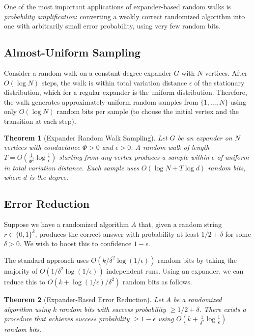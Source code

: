 \documentclass[twoside,12pt]{book}
\theoremstyle{plain}
\newtheorem{theorem}{Theorem}[chapter]
\theoremstyle{definition}
\theoremstyle{remark}
\begin{document}
One of the most important applications of expander-based random walks is
\emph{probability amplification}: converting a weakly correct randomized
algorithm into one with arbitrarily small error probability, using very
few random bits.

\subsection{Almost-Uniform Sampling}

Consider a random walk on a constant-degree expander $G$ with $N$ vertices.
After $O(\log N)$ steps, the walk is within total variation distance
$\epsilon$ of the stationary distribution, which for a regular expander
is the uniform distribution. Therefore, the walk generates
approximately uniform random samples from $\{1, \ldots, N\}$ using only
$O(\log N)$ random bits per sample (to choose the initial vertex and the
transition at each step).

\begin{theorem}[Expander Random Walk Sampling]\label{thm:exp-sampling}
Let $G$ be an expander on $N$ vertices with conductance $\Phi > 0$ and
$\epsilon > 0$. A random walk of length $T = O(\frac{1}{\Phi^2} \log
\frac{1}{\epsilon})$ starting from any vertex produces a sample within
$\epsilon$ of uniform in total variation distance. Each sample uses
$O(\log N + T \log d)$ random bits, where $d$ is the degree.
\end{theorem}

\subsection{Error Reduction}

Suppose we have a randomized algorithm $A$ that, given a random string
$r \in \{0,1\}^k$, produces the correct answer with probability at least
$1/2 + \delta$ for some $\delta > 0$. We wish to boost this to
confidence $1 - \epsilon$.

The standard approach uses $O(k/\delta^2 \log(1/\epsilon))$ random bits
by taking the majority of $O(1/\delta^2 \log(1/\epsilon))$ independent
runs. Using an expander, we can reduce this to $O(k + \log(1/\epsilon) /
\delta^2)$ random bits as follows.

\begin{theorem}[Expander-Based Error Reduction]\label{thm:error-reduction}
Let $A$ be a randomized algorithm using $k$ random bits with success
probability $\geq 1/2 + \delta$. There exists a procedure that achieves
success probability $\geq 1 - \epsilon$ using
$O(k + \frac{1}{\delta^2} \log \frac{1}{\epsilon})$ random bits.
\end{theorem}
\end{document}
